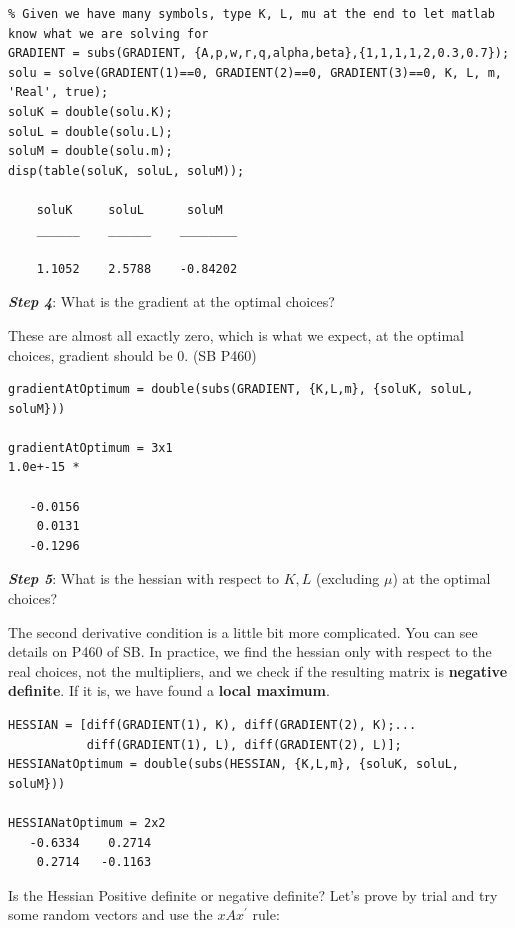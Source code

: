 \documentclass[
]{book}
\begin{document}
\begin{verbatim}
% Given we have many symbols, type K, L, mu at the end to let matlab know what we are solving for
GRADIENT = subs(GRADIENT, {A,p,w,r,q,alpha,beta},{1,1,1,1,2,0.3,0.7});
solu = solve(GRADIENT(1)==0, GRADIENT(2)==0, GRADIENT(3)==0, K, L, m, 'Real', true);
soluK = double(solu.K);
soluL = double(solu.L);
soluM = double(solu.m);
disp(table(soluK, soluL, soluM));

    soluK     soluL      soluM  
    ______    ______    ________

    1.1052    2.5788    -0.84202
\end{verbatim}

\textbf{\emph{Step 4}}: What is the gradient at the optimal choices?

These are almost all exactly zero, which is what we expect, at the
optimal choices, gradient should be 0. (SB P460)

\begin{verbatim}
gradientAtOptimum = double(subs(GRADIENT, {K,L,m}, {soluK, soluL, soluM}))

gradientAtOptimum = 3x1    
1.0e+-15 *

   -0.0156
    0.0131
   -0.1296
\end{verbatim}

\textbf{\emph{Step 5}}: What is the hessian with respect to \(K,L\) (excluding
\(\mu\)) at the optimal choices?

The second derivative condition is a little bit more complicated. You
can see details on P460 of SB. In practice, we find the hessian only
with respect to the real choices, not the multipliers, and we check if
the resulting matrix is \textbf{negative definite}. If it is, we have found a
\textbf{local maximum}.

\begin{verbatim}
HESSIAN = [diff(GRADIENT(1), K), diff(GRADIENT(2), K);...
           diff(GRADIENT(1), L), diff(GRADIENT(2), L)];
HESSIANatOptimum = double(subs(HESSIAN, {K,L,m}, {soluK, soluL, soluM}))

HESSIANatOptimum = 2x2    
   -0.6334    0.2714
    0.2714   -0.1163
\end{verbatim}

Is the Hessian Positive definite or negative definite? Let's prove by
trial and try some random vectors and use the \(xAx^{\prime }\) rule:
\end{document}
